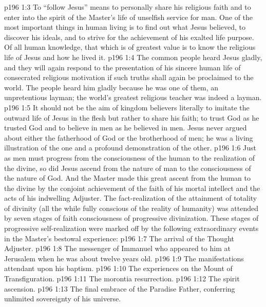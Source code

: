 \vs p196 1:3 \pc To “follow Jesus” means to personally share his religious faith and to enter into the spirit of the Master’s life of unselfish service for man. One of the most important things in human living is to find out what Jesus believed, to discover his ideals, and to strive for the achievement of his exalted life purpose. Of all human knowledge, that which is of greatest value is to know the religious life of Jesus and how he lived it.
\vs p196 1:4 The common people heard Jesus gladly, and they will again respond to the presentation of his sincere human life of consecrated religious motivation if such truths shall again be proclaimed to the world. The people heard him gladly because he was one of them, an unpretentious layman; the world’s greatest religious teacher was indeed a layman.
\vs p196 1:5 It should not be the aim of kingdom believers literally to imitate the outward life of Jesus in the flesh but rather to share his faith; to trust God as he trusted God and to believe in men as he believed in men. Jesus never argued about either the fatherhood of God or the brotherhood of men; he was a living illustration of the one and a profound demonstration of the other.
\vs p196 1:6 Just as men must progress from the consciousness of the human to the realization of the divine, so did Jesus ascend from the nature of man to the consciousness of the nature of God. And the Master made this great ascent from the human to the divine by the conjoint achievement of the faith of his mortal intellect and the acts of his indwelling Adjuster. The fact\hyp{}realization of the attainment of totality of divinity (all the while fully conscious of the reality of humanity) was attended by seven stages of faith consciousness of progressive divinization. These stages of progressive self\hyp{}realization were marked off by the following extraordinary events in the Master’s bestowal experience:
\vs p196 1:7 \bibnobreakspace The arrival of the Thought Adjuster.
\vs p196 1:8 \bibnobreakspace The messenger of Immanuel who appeared to him at Jerusalem when he was about twelve years old.
\vs p196 1:9 \bibnobreakspace The manifestations attendant upon his baptism.
\vs p196 1:10 \bibnobreakspace The experiences on the Mount of Transfiguration.
\vs p196 1:11 \bibnobreakspace The morontia resurrection.
\vs p196 1:12 \bibnobreakspace The spirit ascension.
\vs p196 1:13 \bibnobreakspace The final embrace of the Paradise Father, conferring unlimited sovereignty of his universe.

